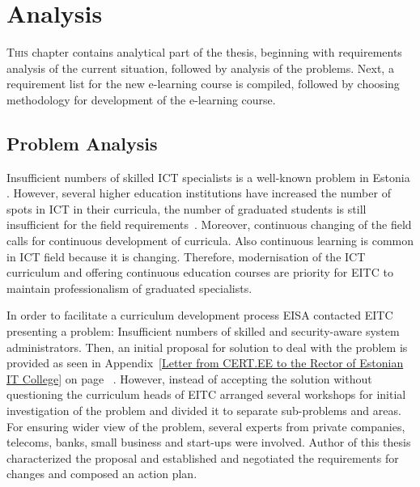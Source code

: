 \chapter{Analysis}
\label{analysis}

\lettrine[lraise=0.1, nindent=0em, slope=-.5em]{\color{Violet}T}{his} chapter contains analytical part of the thesis, beginning with requirements analysis of the current situation, followed by analysis of the problems. Next, a requirement list for the new e-learning course  is compiled, followed by choosing methodology for development of the e-learning course. 

\section{Problem Analysis}
\label{Problem Analysis}


Insufficient numbers of skilled \gls{ICT} specialists is a well-known problem in Estonia \citep{website:ict_puudu, website:ict_needs}. However, several higher education institutions have increased the number of spots in \gls{ICT} in their curricula, the number of graduated students is still insufficient for the field requirements~\citep{website:TU_ict,website:itc_facts}. Moreover,  continuous changing of the field calls for continuous development of curricula. Also continuous learning is common in \gls{ICT} field because it is changing. Therefore, modernisation of the  \gls{ICT} curriculum and offering continuous education courses are priority for \gls{EITC} to maintain professionalism of graduated specialists.

In order to facilitate a curriculum development process \gls{EISA} contacted \gls{EITC} presenting a problem: Insufficient numbers of skilled and security-aware system administrators. Then, an initial proposal for solution to deal with the problem is provided as seen in Appendix~\ref{Letter from CERT.EE to the Rector of Estonian IT College} on page ~\pageref{Letter from CERT.EE to the Rector of Estonian IT College}. However, instead of accepting the solution without questioning the curriculum heads of \gls{EITC} arranged several workshops for initial investigation of the problem and divided it to separate sub-problems and areas. For ensuring wider view of the problem, several experts from private companies, telecoms, banks, small business and start-ups were involved. Author of this thesis characterized the proposal and established and negotiated the requirements for changes and composed an action plan.


